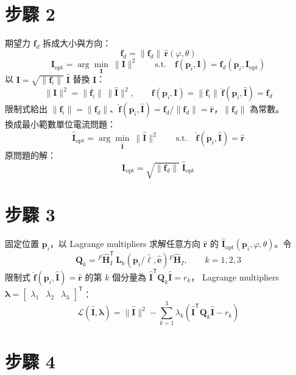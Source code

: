 \documentclass[11pt]{article}
\newcommand{\rh}{\hat{\mathbf{r}}}
\newcommand{\Ij}{\mathbf{I}}
\newcommand{\Ijh}{\hat{\mathbf{I}}}
\newcommand{\fij}{\mathbf{f}_{i}}
\begin{document}
\section*{步驟 2}

期望力 $\mathbf{f}_d$ 拆成大小與方向：
\[
\mathbf{f}_d=\|\mathbf{f}_d\|\,\rh(\varphi,\theta)
\]
\[
\mathbf{I}_{\mathrm{opt}}=\arg\min_{\Ij}\ \|\Ij\|^2
\qquad\text{s.t.}\quad \mathbf{f}\!\left(\mathbf{p}_i,\Ij\right)=\mathbf{f}_d\!\left(\mathbf{p}_i,\mathbf{I}_{\mathrm{opt}}\right)
\]
以 $\Ij=\sqrt{\|\fij\|}\;\Ijh$ 替換 $\Ij$：
\[
\|\Ij\|^2=\|\fij\|\,\|\Ijh\|^2,\qquad
\mathbf{f}\!\left(\mathbf{p}_i,\Ij\right)=\|\fij\|\,\hat{\mathbf{f}}\!\left(\mathbf{p}_i,\Ijh\right)=\mathbf{f}_d
\]
限制式給出 $\|\fij\|=\|\mathbf{f}_d\|$、$\hat{\mathbf{f}}(\mathbf{p}_i,\Ijh)=\mathbf{f}_d/\|\mathbf{f}_d\|=\rh$，$\|\mathbf{f}_d\|$ 為常數。\\[4pt]
換成最小範數單位電流問題：
\[
\hat{\mathbf{I}}_{\mathrm{opt}}=\arg\min_{\Ijh}\ \|\Ijh\|^2
\qquad\text{s.t.}\quad \hat{\mathbf{f}}\!\left(\mathbf{p}_i,\Ijh\right)=\rh
\]
原問題的解：
\[
\mathbf{I}_{\mathrm{opt}}=\sqrt{\|\mathbf{f}_d\|}\;\hat{\mathbf{I}}_{\mathrm{opt}}
\]

\section*{步驟 3}

固定位置 $\mathbf{p}_i$，以 Lagrange multipliers 求解任意方向 $\rh$ 的 $\hat{\mathbf{I}}_{\mathrm{opt}}(\mathbf{p}_i,\varphi,\theta)$。令
\[
\mathbf{Q}_k={}^{F}\hat{\mathbf{H}}_{I}^{\mathsf T}\,\mathbf{L}_k\!\left(\mathbf{p}_i/\hat{\ell},\hat{\mathbf{e}}\right){}^{F}\hat{\mathbf{H}}_{I},
\qquad k=1,2,3
\]
限制式 $\hat{\mathbf{f}}(\mathbf{p}_i,\Ijh)=\rh$ 的第 $k$ 個分量為 $\Ijh^{\mathsf T}\mathbf{Q}_k\Ijh=r_k$，
Lagrange multipliers $\boldsymbol{\lambda}=\begin{bmatrix}\lambda_1 & \lambda_2 & \lambda_3\end{bmatrix}^{\mathsf T}$：
\[
\mathcal{L}\!\left(\Ijh,\boldsymbol{\lambda}\right)
=\|\Ijh\|^2-\sum_{k=1}^{3}\lambda_k\left(\Ijh^{\mathsf T}\mathbf{Q}_k\Ijh-r_k\right)
\]

\section*{步驟 4}
\end{document}
